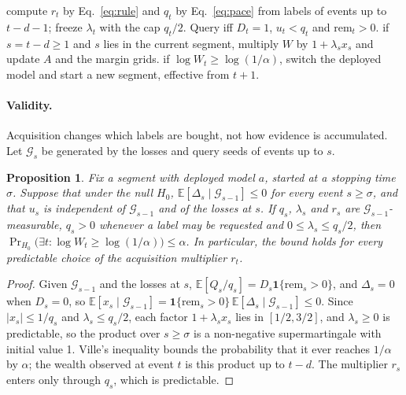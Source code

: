 \documentclass[10pt]{article}
\newtheorem{proposition}{Proposition}
\begin{document}
\begin{algorithm}[t]
\caption{Settled-decision acquisition (one event)}
\label{alg:main}
\begin{algorithmic}[1]
 compute $r_t$ by Eq.~\eqref{eq:rule} and $q_t$ by Eq.~\eqref{eq:pace}
from labels of events up to $t-d-1$; freeze $\lambda_t$ with the cap $q_t/2$.
\STATE Query iff $D_t=1$, $u_t<q_t$ and $\mathrm{rem}_t>0$.
 if $s=t-d\ge1$ and $s$ lies in the current segment, multiply $W$ by
$1+\lambda_s x_s$ and update $A$ and the margin grids.
 if $\log W_t\ge\log(1/\alpha)$, switch the deployed model and start a
new segment, effective from $t+1$.
\end{algorithmic}
\end{algorithm}

\paragraph{Validity.} Acquisition changes which labels are bought, not how evidence is
accumulated. Let $\mathcal{G}_s$ be generated by the losses and query seeds of events up to $s$.

\begin{proposition}\label{prop:validity}
Fix a segment with deployed model $a$, started at a stopping time $\sigma$. Suppose that under the
null $H_0$, $\mathbb{E}[\Delta_s\mid\mathcal{G}_{s-1}]\le0$ for every event $s\ge\sigma$, and that
$u_s$ is independent of $\mathcal{G}_{s-1}$ and of the losses at $s$. If $q_s$, $\lambda_s$ and
$r_s$ are $\mathcal{G}_{s-1}$-measurable, $q_s>0$ whenever a label may be requested and
$0\le\lambda_s\le q_s/2$, then $\Pr_{H_0}\bigl(\exists t:\log W_t\ge\log(1/\alpha)\bigr)\le\alpha$.
In particular, the bound holds for every predictable choice of the acquisition multiplier $r_t$.
\end{proposition}

\begin{proof}
Given $\mathcal{G}_{s-1}$ and the losses at $s$, $\mathbb{E}[Q_s/q_s]=D_s\mathbf{1}\{\mathrm{rem}_s>0\}$,
and $\Delta_s=0$ when $D_s=0$, so $\mathbb{E}[x_s\mid\mathcal{G}_{s-1}]=\mathbf{1}\{\mathrm{rem}_s>0\}
\,\mathbb{E}[\Delta_s\mid\mathcal{G}_{s-1}]\le0$. Since $|x_s|\le1/q_s$ and $\lambda_s\le q_s/2$,
each factor $1+\lambda_s x_s$ lies in $[1/2,3/2]$, and $\lambda_s\ge0$ is predictable, so the
product over $s\ge\sigma$ is a non-negative supermartingale with initial value 1. Ville's
inequality bounds the probability that it ever reaches $1/\alpha$ by $\alpha$; the wealth observed
at event $t$ is this product up to $t-d$. The multiplier $r_s$ enters only through $q_s$, which is
predictable.
\end{proof}
\end{document}
